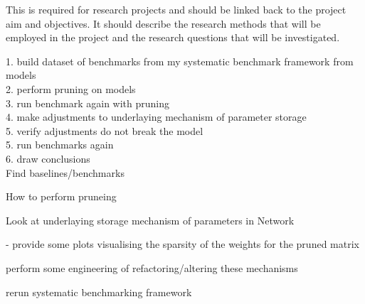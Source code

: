 \documentclass[../../D1.tex]{subfiles}
\begin{document}
This is required for research projects and should be linked
back to the project aim and objectives. It should describe the research methods that
will be employed in the project and the research questions that will be investigated.


1. build dataset of benchmarks from my systematic benchmark framework from models\\
2. perform pruning on models\\
3. run benchmark again with pruning\\
4. make adjustments to underlaying mechanism of parameter storage\\
5. verify adjustments do not break the model\\
5. run benchmarks again\\
6. draw conclusions\\

Find baselines/benchmarks

How to perform pruneing



Look at underlaying storage mechanism of parameters in Network

 - provide some plots visualising the sparsity of the weights for the pruned matrix

perform some engineering of refactoring/altering these mechanisms

rerun systematic benchmarking framework
\end{document}
